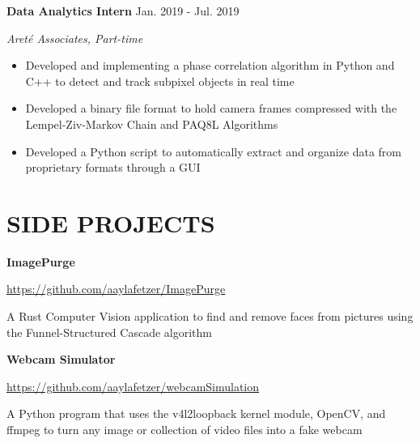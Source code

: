 \documentclass[paper=a4,fontsize=10pt]{scrartcl} %
\newcommand{\sepspace}{\vspace*{1em}}		%
\newcommand{\NewPart}[1]{\section*{\uppercase{#1}}}
\newcommand{\WorkEntry}[4]{
		\noindent \textbf{#1} \hfill      %
		#2 \par
		\textit{#3} \par        %
		\small #4 %
		\normalsize \par
}
\newcommand{\SideProjectEntry}[3]{
		\noindent \textbf{#1} \hfill \par     %
		\noindent #2 \par              %
		\small #3 %
		\normalsize \par
}
\begin{document}
\WorkEntry{Data Analytics Intern}{Jan. 2019 - Jul. 2019}{Areté Associates, Part-time}{
	\begin{itemize}
		\item Developed and implementing a phase correlation algorithm in Python and C++ to detect and track subpixel objects in real time
		\item Developed a binary file format to hold camera frames compressed with the Lempel-Ziv-Markov Chain and PAQ8L Algorithms
		\item Developed a Python script to automatically extract and organize data from proprietary formats through a GUI 
	\end{itemize}
}


\NewPart{Side Projects}{}
\SideProjectEntry{ImagePurge}{\url{https://github.com/aaylafetzer/ImagePurge}}{A Rust Computer Vision application to find and remove faces from pictures using the Funnel-Structured Cascade algorithm}
\sepspace
\SideProjectEntry{Webcam Simulator}{\url{https://github.com/aaylafetzer/webcamSimulation}}{A Python program that uses the v4l2loopback kernel module, OpenCV, and ffmpeg to turn any image or collection of video files into a fake webcam}
\end{document}
